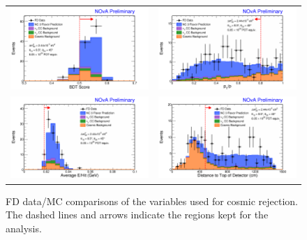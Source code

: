 \begin{figure}[htbp]
  \centering
  \begin{tabular}{c c}
    \includegraphics[width=.48\textwidth]{figures/FDDataMC/FDCosBDTStack.png} &
    \includegraphics[width=.48\textwidth]{figures/FDDataMC/FDPTPStack.png} \\
    \includegraphics[width=.48\textwidth]{figures/FDDataMC/FDEperHitStack.png} &
    \includegraphics[width=.48\textwidth]{figures/FDDataMC/FDDistTopStack.png} \\
  \end{tabular}
  \caption[FD Data/MC Comparison: Cosmic Rejection Variable Distributions]{FD data/MC comparisons of the variables used for cosmic rejection. The dashed lines and arrows indicate the regions kept for the analysis.}
  \label{fig:FDDataMCCosRej}
\end{figure}